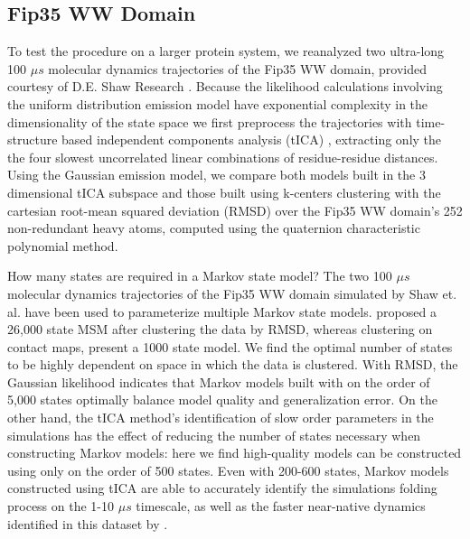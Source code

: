 \documentclass[twocolumn,floatfix,nofootinbib,aps]{revtex4-1}
\begin{document}
\subsection{Fip35 WW Domain}

To test the procedure on a larger protein system, we reanalyzed two ultra-long 100 $\mu s$ molecular dynamics trajectories of the Fip35 WW domain\cite{Liu2008Experimental}, provided courtesy of D.E. Shaw Research \cite{Shaw2010Atomic}. Because the likelihood calculations involving the uniform distribution emission model have exponential complexity in the dimensionality of the state space we first preprocess the trajectories with time-structure based independent components analysis (tICA) \cite{Schwantes2013Improvements, Perez2013Identification}, extracting only the the four slowest uncorrelated linear combinations of residue-residue distances. Using the Gaussian emission model, we compare both models built in the 3 dimensional tICA subspace and those built using k-centers clustering with the cartesian root-mean squared deviation (RMSD) over the Fip35 WW domain's 252 non-redundant heavy atoms, computed using the quaternion characteristic polynomial method\cite{Theobald2005Rapid}.

How many states are required in a Markov state model? The two 100 $\mu s$ molecular dynamics trajectories of the Fip35 WW domain simulated by Shaw et. al.\cite{Shaw2010Atomic} have been used to parameterize multiple Markov state models. \citet{Lane2011Markov} proposed a 26,000 state MSM after clustering the data by RMSD, whereas \citet{Kellogg2012Evaluation} clustering on contact maps, present a 1000 state model. We find the optimal number of states to be highly dependent on space in which the data is clustered. With RMSD, the Gaussian likelihood indicates that Markov models built with on the order of 5,000 states optimally balance model quality and generalization error. On the other hand, the tICA method's identification of slow order parameters in the simulations has the effect of reducing the number of states necessary when constructing Markov models: here we find high-quality models can be constructed using only on the order of 500 states. Even with 200-600 states, Markov models constructed using tICA are able to accurately identify the simulations folding process on the 1-10 $\mu s$ timescale, as well as the faster near-native dynamics identified in this dataset by \citet{McGibbon2013Learning}.
\end{document}
